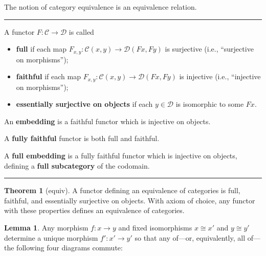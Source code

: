 \documentclass[12pt]{article}
\newcommand{\keyword}[1]{\textbf{#1}}
\newcommand{\sepline}{\rule{\textwidth}{0.4pt}}
\theoremstyle{definition}
\newtheorem{theorem}{Theorem}
\newtheorem{lemma}{Lemma}
\newcommand{\CC}{\mathcal{C}}
\newcommand{\DD}{\mathcal{D}}
\newcommand{\<}{\left\langle}
\renewcommand{\>}{\right\rangle}
\newcommand{\isom}{\cong}
\begin{document}
The notion of category equivalence is an equivalence relation.

\sepline

A functor $F : \CC \to \DD$ is called
\begin{itemize}
    \item \keyword{full} if each map $F_{x,y} : \CC(x, y) \to \DD(Fx, Fy)$ is surjective (i.e., ``surjective on morphisms'');
    \item \keyword{faithful} if each map $F_{x,y} : \CC(x, y) \to \DD(Fx, Fy)$ is injective (i.e., ``injective on morphisms'');
    \item \keyword{essentially surjective on objects} if each $y \in \DD$ is isomorphic to some $Fx$.
\end{itemize}

An \keyword{embedding} is a faithful functor which is injective on objects.

A \keyword{fully faithful} functor is both full and faithful.

A \keyword{full embedding} is a fully faithful functor which is injective on objects, defining a \keyword{full subcategory} of the codomain.

\sepline



\begin{theorem}[equiv]
    A functor defining an equivalence of categories is full, faithful, and essentially surjective on objects.
    With axiom of choice, any functor with these properties defines an equivalence of categories.
\end{theorem}

\begin{lemma}
    Any morphism $f : x \to y$ and fixed isomorphisms $x \isom x'$ and $y \isom y'$ determine a unique morphism $f' : x' \to y'$ so that any of---or, equivalently, all of---the following four diagrams commute:
    \begin{center}
        \hspace{1em}
        \hspace{1em}
        \hspace{1em}
    \end{center}
\end{lemma}
\end{document}

